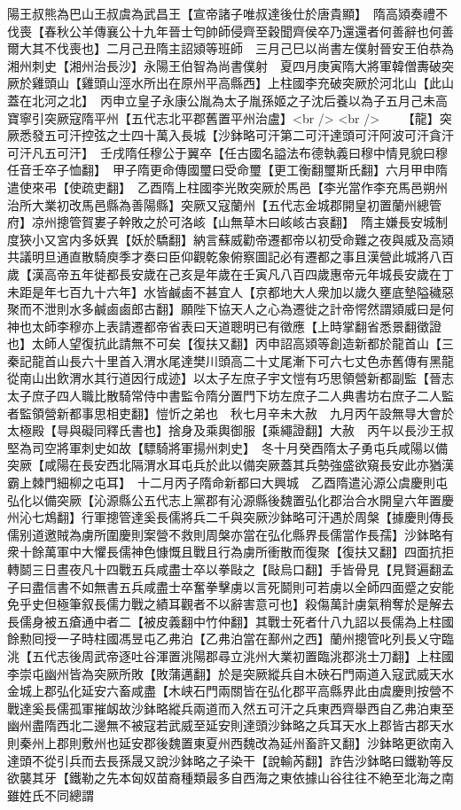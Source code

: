 陽王叔熊為巴山王叔虞為武昌王【宣帝諸子唯叔達後仕於唐貴顯】　隋高熲奏禮不伐喪【春秋公羊傳襄公十九年晉士匄帥師侵齊至穀聞齊侯卒乃還還者何善辭也何善爾大其不伐喪也】二月己丑隋主詔熲等班師　三月己巳以尚書左僕射晉安王伯恭為湘州刺史【湘州治長沙】永陽王伯智為尚書僕射　夏四月庚寅隋大將軍韓僧夀破突厥於雞頭山【雞頭山涇水所出在原州平高縣西】上柱國李充破突厥於河北山【此山蓋在北河之北】　丙申立皇子永康公胤為太子胤孫姬之子沈后養以為子五月己未高寶寧引突厥寇隋平州【五代志北平郡舊置平州治盧】<br />
<br />
　　【龍】突厥悉發五可汗控弦之士四十萬入長城【沙鉢略可汗第二可汗達頭可汗阿波可汗貪汗可汗凡五可汗】　壬戌隋任穆公于翼卒【任古國名謚法布德執義曰穆中情見貌曰穆任音壬卒子恤翻】　甲子隋更命傳國璽曰受命璽【更工衡翻璽斯氏翻】六月甲申隋遣使來弔【使疏吏翻】　乙酉隋上柱國李光敗突厥於馬邑【李光當作李充馬邑朔州治所大業初改馬邑縣為善陽縣】突厥又寇蘭州【五代志金城郡開皇初置蘭州總管府】凉州摠管賀婁子幹敗之於可洛峐【山無草木曰峐峐古哀翻】　隋主嫌長安城制度狹小又宮内多妖異【妖於驕翻】納言蘇威勸帝遷都帝以初受命難之夜與威及高熲共議明旦通直散騎庾季才奏曰臣仰觀乾象俯察圖記必有遷都之事且漢營此城將八百歲【漢高帝五年徙都長安歲在己亥是年歲在壬寅凡八百四歲惠帝元年城長安歲在丁未距是年七百九十六年】水皆鹹鹵不甚宜人【京都地大人衆加以歲久壅底墊隘穢惡聚而不泄則水多鹹鹵鹵郎古翻】願陛下協天人之心為遷徙之計帝愕然謂熲威曰是何神也太師李穆亦上表請遷都帝省表曰天道聰明已有徵應【上時掌翻省悉景翻徵證也】太師人望復抗此請無不可矣【復扶又翻】丙申詔高熲等創造新都於龍首山【三秦記龍首山長六十里首入渭水尾達樊川頭高二十丈尾漸下可六七丈色赤舊傳有黑龍從南山出飲渭水其行道因行成迹】以太子左庶子宇文愷有巧思領營新都副監【晉志太子庶子四人職比散騎常侍中書監令隋分置門下坊左庶子二人典書坊右庶子二人監者監領營新都事思相吏翻】愷忻之弟也　秋七月辛未大赦　九月丙午設無㝵大會於太極殿【㝵與礙同釋氏書也】捨身及乘輿御服【乘繩證翻】大赦　丙午以長沙王叔堅為司空將軍刺史如故【驃騎將軍揚州刺史】　冬十月癸酉隋太子勇屯兵咸陽以備突厥【咸陽在長安西北隔渭水耳屯兵於此以備突厥蓋其兵勢強盛欲窺長安此亦猶漢霸上棘門細柳之屯耳】　十二月丙子隋命新都曰大興城　乙酉隋遣沁源公虞慶則屯弘化以備突厥【沁源縣公五代志上黨郡有沁源縣後魏置弘化郡治合水開皇六年置慶州沁七鴆翻】行軍摠管達奚長儒將兵二千與突厥沙鉢略可汗遇於周槃【據慶則傳長儒别道邀賊為虜所圍慶則案營不救則周槃亦當在弘化縣界長儒當作長孺】沙鉢略有衆十餘萬軍中大懼長儒神色慷慨且戰且行為虜所衝散而復聚【復扶又翻】四面抗拒轉鬬三日晝夜凡十四戰五兵咸盡士卒以拳敺之【敺烏口翻】手皆骨見【見賢遍翻孟子曰盡信書不如無書五兵咸盡士卒奮拳擊虜以言死鬬則可若虜以全師四面蹙之安能免乎史但極筆叙長儒力戰之績耳觀者不以辭害意可也】殺傷萬計虜氣稍奪於是解去長儒身被五瘡通中者二【被皮義翻中竹仲翻】其戰士死者什八九詔以長儒為上柱國餘勲囘授一子時柱國馮昱屯乙弗泊【乙弗泊當在鄯州之西】蘭州摠管叱列長乂守臨洮【五代志後周武帝逐吐谷渾置洮陽郡尋立洮州大業初置臨洮郡洮士刀翻】上柱國李崇屯幽州皆為突厥所敗【敗蒲邁翻】於是突厥縱兵自木硤石門兩道入寇武威天水金城上郡弘化延安六畜咸盡【木峡石門兩關皆在弘化郡平高縣界此由虞慶則按營不戰達奚長儒孤軍摧衂故沙鉢略縱兵兩道而入然五可汗之兵東西齊舉西自乙弗泊東至幽州盡隋西北二邊無不被寇若武威至延安則達頭沙鉢略之兵耳天水上郡皆古郡天水則秦州上郡則敷州也延安郡後魏置東夏州西魏改為延州畜許又翻】沙鉢略更欲南入達頭不從引兵而去長孫晟又說沙鉢略之子染干【說輸芮翻】詐告沙鉢略曰鐵勒等反欲襲其牙【鐵勒之先本匈奴苗裔種類最多自西海之東依據山谷往往不絶至北海之南雖姓氏不同總謂
